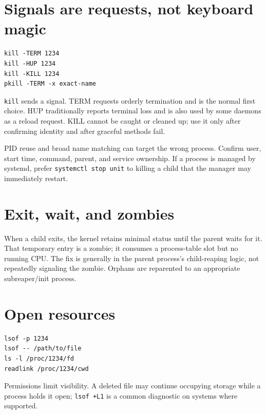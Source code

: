 \documentclass[11pt,oneside,openany]{book}
\begin{document}
\section{Signals are requests, not keyboard magic}
\begin{lstlisting}
kill -TERM 1234
kill -HUP 1234
kill -KILL 1234
pkill -TERM -x exact-name
\end{lstlisting}
\texttt{kill} sends a signal. TERM requests orderly termination and is the normal first choice. HUP traditionally reports terminal loss and is also used by some daemons as a reload request. KILL cannot be caught or cleaned up; use it only after confirming identity and after graceful methods fail.

\begin{warningbox}
PID reuse and broad name matching can target the wrong process. Confirm user, start time, command, parent, and service ownership. If a process is managed by systemd, prefer \texttt{systemctl stop unit} to killing a child that the manager may immediately restart.
\end{warningbox}

\section{Exit, wait, and zombies}
When a child exits, the kernel retains minimal status until the parent waits for it. That temporary entry is a zombie; it consumes a process-table slot but no running CPU. The fix is generally in the parent process's child-reaping logic, not repeatedly signaling the zombie. Orphans are reparented to an appropriate subreaper/init process.

\section{Open resources}
\begin{lstlisting}
lsof -p 1234
lsof -- /path/to/file
ls -l /proc/1234/fd
readlink /proc/1234/cwd
\end{lstlisting}
Permissions limit visibility. A deleted file may continue occupying storage while a process holds it open; \texttt{lsof +L1} is a common diagnostic on systems where supported.
\end{document}
